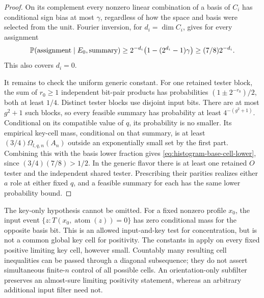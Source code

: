 \begin{proof}
On its complement every nonzero linear combination of a basis of
$C_i$ has conditional sign bias at most $\gamma$, regardless of how
the space and basis were selected from the unit. Fourier inversion,
for $d_i=\dim C_i$, gives for every assignment
\[
 \mathbb P(\text{assignment}\mid E_0,\text{summary})
 \ge2^{-d_i}\bigl(1-(2^{d_i}-1)\gamma\bigr)
 \ge(7/8)2^{-d_i}.
\]
This also covers $d_i=0$.

It remains to check the uniform generic constant. For one retained
tester block, the sum of $r_0\ge1$ independent bit-pair products has
probabilities $(1\pm2^{-r_0})/2$, both at least $1/4$. Distinct tester
blocks use disjoint input bits. There are at most $g^2+1$ such blocks,
so every feasible summary has probability at least
$4^{-(g^2+1)}$. Conditional on its compatible value of $q$, its
probability is no smaller. Its empirical key-cell mass, conditional
on that summary, is at least $(3/4)\Omega_{l,q,n}(A_n)$ outside an
exponentially small set by the first part. Combining this with the
basis lower fraction gives \eqref{eq:histogram-base-cell-lower}, since
$(3/4)(7/8)>1/2$. In the generic flavor there is at least one retained
$O$ tester and the independent shared tester. Prescribing their
parities realizes either $a$ role at either fixed $q$, and a feasible
summary for each has the same lower probability bound.
\end{proof}

\begin{remark}\label{rem:unary-positivity-key-only}
The key-only hypothesis cannot be omitted. For a fixed nonzero
profile $x_0$, the input event
$\{z:T(x_0,\operatorname{atom}(z))=0\}$ has zero conditional mass for
the opposite basis bit. This is an allowed input-and-key test for
concentration, but is not a common global key cell for positivity.
The constants in  apply on every fixed
positive limiting key cell, however small. Countably many resulting
cell inequalities can be passed through a diagonal subsequence;
they do not assert simultaneous finite-$n$ control of all possible
cells. An orientation-only subfilter preserves an almost-sure
limiting positivity statement, whereas an arbitrary additional input
filter need not.
\end{remark}
